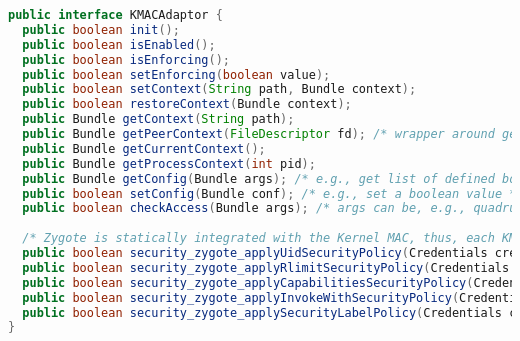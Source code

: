 \documentclass[letterpaper,twocolumn,10pt]{article}
\begin{document}
\begin{lstlisting}[language=Java,basicstyle=\footnotesize,caption={Interface for Access Control Policy Modules to Linux Security Module},label={listing:kmacapi}]
public interface KMACAdaptor {
  public boolean init();
  public boolean isEnabled();
  public boolean isEnforcing();
  public boolean setEnforcing(boolean value);
  public boolean setContext(String path, Bundle context);
  public boolean restoreContext(Bundle context);
  public Bundle getContext(String path);
  public Bundle getPeerContext(FileDescriptor fd); /* wrapper around getsockopt call to LSM */
  public Bundle getCurrentContext();
  public Bundle getProcessContext(int pid);
  public Bundle getConfig(Bundle args); /* e.g., get list of defined booleans or one specific boolean value */
  public boolean setConfig(Bundle conf); /* e.g., set a boolean value */
  public boolean checkAccess(Bundle args); /* args can be, e.g., quadruple of subject ctx, object ctx, object class, op */
  
  /* Zygote is statically integrated with the Kernel MAC, thus, each KMACAdaptor must implemented these hooks in ZygoteConnection */
  public boolean security_zygote_applyUidSecurityPolicy(Credentials creds, Bundle peerSecurityContext);
  public boolean security_zygote_applyRlimitSecurityPolicy(Credentials creds, Bundle peerSecurityContext);
  public boolean security_zygote_applyCapabilitiesSecurityPolicy(Credentials creds, Bundle peerSecurityContext);
  public boolean security_zygote_applyInvokeWithSecurityPolicy(Credentials creds, Bundle peerSecurityContext);
  public boolean security_zygote_applySecurityLabelPolicy(Credentials creds, Bundle peerSecurityContext);
}
\end{lstlisting}
\end{document}
